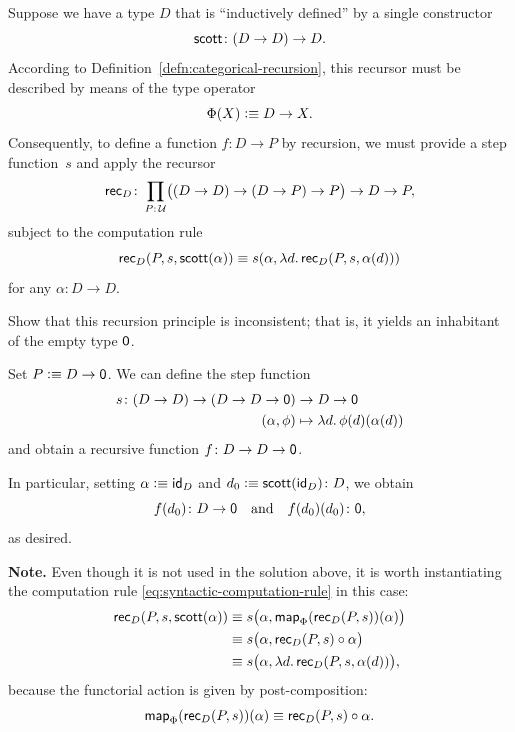 \begin{exr}
    Suppose we have a type\/ $D$ that is ``inductively defined'' by a single constructor
    \[
        \fun{scott}\colon(D\to D)\to D.
    \]
    According to\/ {\upshape Definition~\ref{defn:categorical-recursion}}, this recursor must be described by means of the type operator
    \[
        \Phi(X)\mathrel{\vcentcolon}\equiv D\to X.
    \]
    Consequently, to define a function\/ $f\colon D\to P$ by recursion, we must provide a step function\/~$s$ and apply the recursor
    \[
        \fun{rec}_D\colon
            \prod_{P\colon\univ}
                \bigl(
                    (D\to D)\to(D\to P)\to P
                \bigr)
                \to D\to P,
    \]
    subject to the computation rule
    \[
        \mathsf{rec}_D(P,s,\mathsf{scott}(\alpha))
            \equiv s(
                \alpha,
                \lambda d.\,\mathsf{rec}_D(P,s,\alpha(d))
                )
    \]
    for any\/ $\alpha\colon D\to D$.
    
    Show that this recursion principle is inconsistent; that is, it yields an inhabitant of the empty type\/ $\mathsf{0}$.
\end{exr}

\begin{solution}
    Set $P\mathrel{\vcentcolon}\equiv D\to\mathsf{0}$. We can define the step function
    \begin{align*}
        s\colon(D\to D)\to(D\to D\to\fun0)
            &\to D\to\fun0\\
        (\alpha,\phi)
            &\mapsto\lambda d.\,\phi(d)(\alpha(d))
    \end{align*}
    and obtain a recursive function $f\colon D\to D\to\fun0$.
    
    In particular, setting $\alpha\mathrel{\vcentcolon}\equiv\mathsf{id}_D$ and $d_0\defeq\fun{scott}(\id_D)\colon D$, we obtain
    \[
        f(d_0)\colon D\to\fun0
        \quad\text{and}\quad
        f(d_0)(d_0)\colon\fun0,
    \]
    as desired.

    {\small
    \textbf{Note.} Even though it is not used in the solution above, it is worth instantiating the computation rule \eqref{eq:syntactic-computation-rule} in this case:
    \begin{align*}
        \mathsf{rec}_D(P,s,\mathsf{scott}(\alpha))
            &\equiv s
                \bigl(
                    \alpha,
                    \mathsf{map}_\Phi(\mathsf{rec}_D(P,s))(\alpha)
                \bigr)\\
            &\equiv s
                \bigl(
                    \alpha,
                    \mathsf{rec}_D(P,s)\circ\alpha
                \bigr)\\
            &\equiv s
                \bigl(
                    \alpha,
                    \lambda d.\,
                        \mathsf{rec}_D(P,s,\alpha(d))
                \bigr),
    \end{align*}
    because the functorial action is given by post-composition:
    \[
        \mathsf{map}_\Phi(\mathsf{rec}_D(P,s))(\alpha)
            \equiv\mathsf{rec}_D(P,s)\circ\alpha.
    \]
    }
\end{solution}

